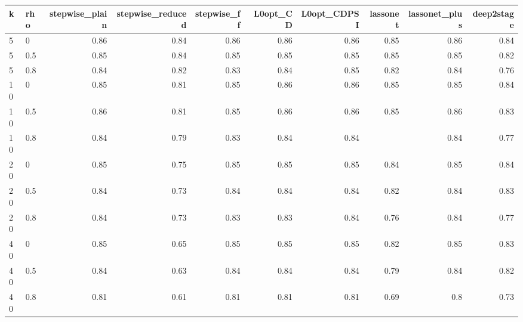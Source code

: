 \begin{tabular}{llrrrrrrrr}
\toprule
k & rho & stepwise\_plain & stepwise\_reduced & stepwise\_ff & L0opt\_CD & L0opt\_CDPSI & lassonet & lassonet\_plus & deep2stage \\
\midrule
5 & 0 & 0.86 & 0.84 & 0.86 & 0.86 & 0.86 & 0.85 & 0.86 & 0.84 \\
5 & 0.5 & 0.85 & 0.84 & 0.85 & 0.85 & 0.85 & 0.85 & 0.85 & 0.82 \\
5 & 0.8 & 0.84 & 0.82 & 0.83 & 0.84 & 0.85 & 0.82 & 0.84 & 0.76 \\
10 & 0 & 0.85 & 0.81 & 0.85 & 0.86 & 0.86 & 0.85 & 0.85 & 0.84 \\
10 & 0.5 & 0.86 & 0.81 & 0.85 & 0.86 & 0.86 & 0.85 & 0.86 & 0.83 \\
10 & 0.8 & 0.84 & 0.79 & 0.83 & 0.84 & 0.84 &  & 0.84 & 0.77 \\
20 & 0 & 0.85 & 0.75 & 0.85 & 0.85 & 0.85 & 0.84 & 0.85 & 0.84 \\
20 & 0.5 & 0.84 & 0.73 & 0.84 & 0.84 & 0.84 & 0.82 & 0.84 & 0.83 \\
20 & 0.8 & 0.84 & 0.73 & 0.83 & 0.83 & 0.84 & 0.76 & 0.84 & 0.77 \\
40 & 0 & 0.85 & 0.65 & 0.85 & 0.85 & 0.85 & 0.82 & 0.85 & 0.83 \\
40 & 0.5 & 0.84 & 0.63 & 0.84 & 0.84 & 0.84 & 0.79 & 0.84 & 0.82 \\
40 & 0.8 & 0.81 & 0.61 & 0.81 & 0.81 & 0.81 & 0.69 & 0.8 & 0.73 \\
\bottomrule
\end{tabular}
